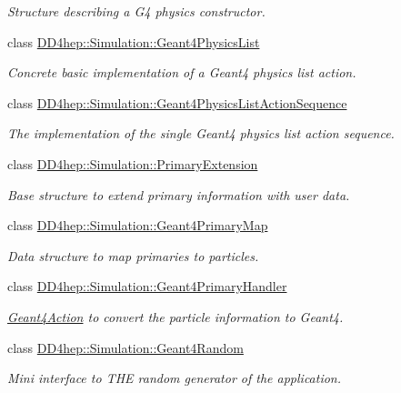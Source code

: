 \begin{DoxyCompactItemize}
\begin{DoxyCompactList}\small\item\em Structure describing a G4 physics constructor. \end{DoxyCompactList}\item 
class \hyperlink{class_d_d4hep_1_1_simulation_1_1_geant4_physics_list}{D\+D4hep\+::\+Simulation\+::\+Geant4\+Physics\+List}
\begin{DoxyCompactList}\small\item\em Concrete basic implementation of a Geant4 physics list action. \end{DoxyCompactList}\item 
class \hyperlink{class_d_d4hep_1_1_simulation_1_1_geant4_physics_list_action_sequence}{D\+D4hep\+::\+Simulation\+::\+Geant4\+Physics\+List\+Action\+Sequence}
\begin{DoxyCompactList}\small\item\em The implementation of the single Geant4 physics list action sequence. \end{DoxyCompactList}\item 
class \hyperlink{class_d_d4hep_1_1_simulation_1_1_primary_extension}{D\+D4hep\+::\+Simulation\+::\+Primary\+Extension}
\begin{DoxyCompactList}\small\item\em Base structure to extend primary information with user data. \end{DoxyCompactList}\item 
class \hyperlink{class_d_d4hep_1_1_simulation_1_1_geant4_primary_map}{D\+D4hep\+::\+Simulation\+::\+Geant4\+Primary\+Map}
\begin{DoxyCompactList}\small\item\em Data structure to map primaries to particles. \end{DoxyCompactList}\item 
class \hyperlink{class_d_d4hep_1_1_simulation_1_1_geant4_primary_handler}{D\+D4hep\+::\+Simulation\+::\+Geant4\+Primary\+Handler}
\begin{DoxyCompactList}\small\item\em \hyperlink{class_d_d4hep_1_1_simulation_1_1_geant4_action}{Geant4\+Action} to convert the particle information to Geant4. \end{DoxyCompactList}\item 
class \hyperlink{class_d_d4hep_1_1_simulation_1_1_geant4_random}{D\+D4hep\+::\+Simulation\+::\+Geant4\+Random}
\begin{DoxyCompactList}\small\item\em Mini interface to T\+HE random generator of the application. \end{DoxyCompactList}\item 

\end{DoxyCompactItemize}
